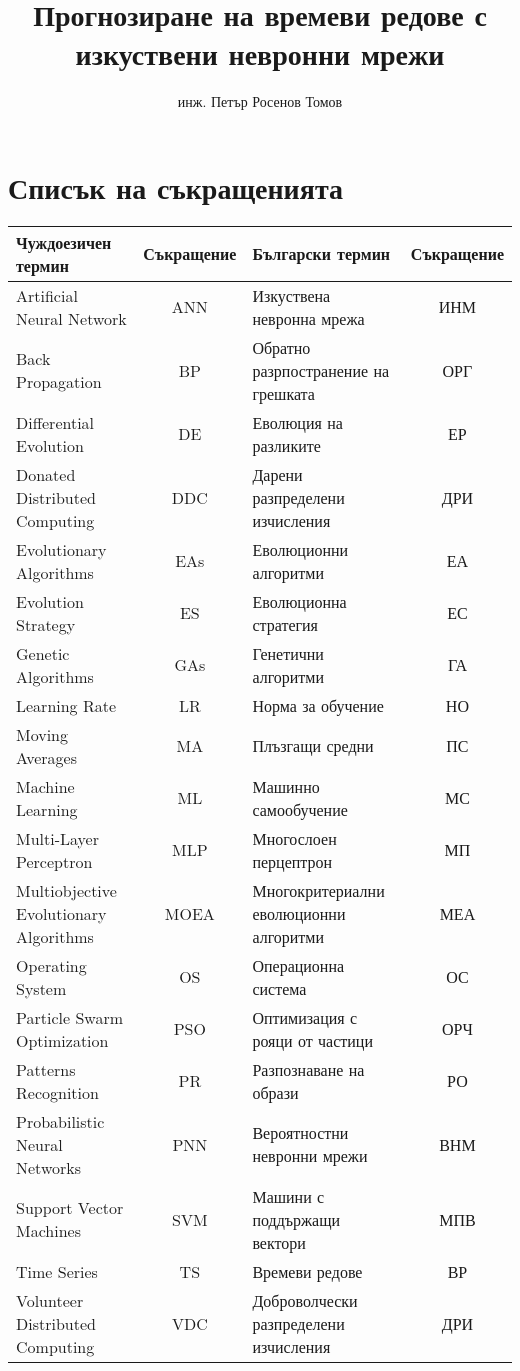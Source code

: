 \documentclass[12pt,a4paper,openany]{book}
\title{Прогнозиране на времеви редове с изкуствени невронни мрежи}
\author{инж. Петър Росенов Томов}
\begin{document}


\thispagestyle{empty}

\setcounter{page}{1}

\tableofcontents

\chapter*{Списък на съкращенията}

\begin{longtable}{ | p{3.75cm} | c | p{3.75cm} | c | }
\hline
\cellcolor{gray!15}Чуждоезичен термин & \cellcolor{gray!15}Съкращение & \cellcolor{gray!15}Български термин & \cellcolor{gray!15}Съкращение \\ [0.05ex] 
\hline
\hline
Artificial Neural Network & ANN & Изкуствена невронна мрежа & ИНМ \\  
\hline
Back Propagation  & BP & Обратно разрпостранение на грешката & ОРГ \\  
\hline
Differential Evolution & DE & Еволюция на разликите & ЕР \\ 
\hline
Donated Distributed Computing & DDC & Дарени разпределени изчисления & ДРИ \\  
\hline
Evolutionary Algorithms & EAs & Еволюционни алгоритми & ЕА \\  
\hline
Evolution Strategy & ES & Еволюционна стратегия & ЕС \\  
\hline
Genetic Algorithms & GAs & Генетични алгоритми & ГА \\  
\hline
Learning Rate & LR & Норма за обучение & НО \\  
\hline
Moving Averages & MA & Плъзгащи средни & ПС \\  
\hline
Machine Learning & ML & Машинно самообучение & МС \\  
\hline
Multi-Layer Perceptron & MLP & Многослоен перцептрон & МП \\  
\hline
Multiobjective Evolutionary Algorithms & MOEA & Многокритериални еволюционни алгоритми & МЕА \\  
\hline
Operating System & OS & Операционна система & ОС \\  
\hline
Particle Swarm Optimization & PSO & Оптимизация с рояци от частици & ОРЧ \\  
\hline
Patterns Recognition & PR & Разпознаване на образи & РО \\  
\hline
Probabilistic Neural Networks & PNN & Вероятностни невронни мрежи & ВНМ \\  
\hline
Support Vector Machines & SVM & Машини с поддържащи вектори & МПВ \\  
\hline
Time Series & TS & Времеви редове & ВР \\  
\hline
Volunteer Distributed Computing & VDC & Доброволчески разпределени изчисления & ДРИ \\  
\hline
\end{longtable}
\end{document}
